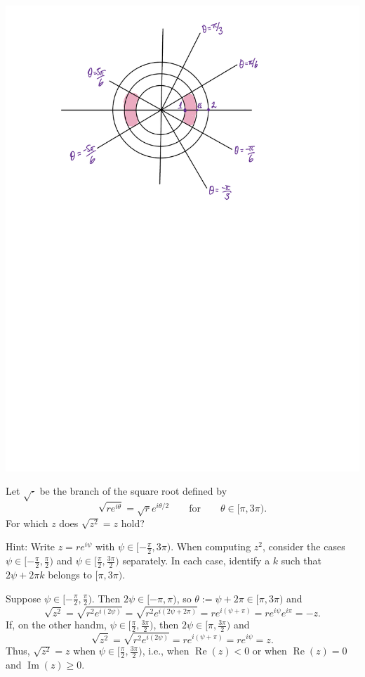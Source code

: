 \documentclass[12pt, addpoints, answers]{exam}
\renewcommand{\Re}{\operatorname{Re}}
\renewcommand{\Im}{\operatorname{Im}}
\begin{document}
\begin{questions}
\begin{parts}
\begin{solution}
            \includegraphics[scale=0.7]{c.pdf}
        \end{solution}
    \end{parts}
        
        
        
    \question[5]
    Let $\sqrt\cdot$ be the branch of the square root defined by
    \[
        \sqrt{re^{i\theta}} = \sqrt re^{i\theta/2}\qquad\text{for}\qquad \theta\in [\pi, 3\pi).
    \]
    For which $z$ does $\sqrt{z^2}=z$ hold?
    
    Hint: Write $z=re^{i\psi}$ with $\psi\in[-\frac\pi2,3\pi)$. When computing $z^2$, consider the cases $\psi\in[-\frac\pi2,\frac\pi2)$ and $\psi\in[\frac\pi2,\frac{3\pi}2)$ separately.
    In each case, identify a $k$ such that $2\psi + 2\pi k$ belongs to $[\pi, 3\pi)$.

    \begin{solution}
        Suppose $\psi\in[-\frac\pi2,\frac\pi2)$.
        Then $2\psi\in[-\pi, \pi)$, so $\theta := \psi + 2\pi\in [\pi, 3\pi)$ and
        \[
            \sqrt{z^2} = \sqrt{r^2e^{i(2\psi)}} = \sqrt{r^2e^{i(2\psi+2\pi)}}=re^{i(\psi + \pi)}=re^{i\psi}e^{i\pi}=-z.
        \]
        If, on the other handm, $\psi\in[\frac\pi2,\frac{3\pi}2)$, then $2\psi\in [\pi, \frac{3\pi}2)$ and
        \[
            \sqrt{z^2} = \sqrt{r^2e^{i(2\psi)}} =re^{i(\psi + \pi)}=re^{i\psi}=z.
        \]
        Thus, $\sqrt{z^2}=z$ when $\psi\in [\frac\pi2,\frac{3\pi}2)$, i.e., when $\Re(z)<0$ or when $\Re(z)=0$ and $\Im(z)\geq 0$.
    \end{solution}
\end{questions}
\end{document}
